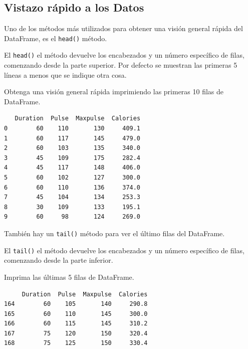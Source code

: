 \subsection{Vistazo rápido a los Datos}

Uno de los métodos más utilizados para obtener una visión general rápida
del DataFrame, es el \texttt{head()} método.

El \texttt{head()} el método devuelve los encabezados y un número
específico de filas, comenzando desde la parte superior. Por defecto se
muestran las primeras 5 líneas a menos que se indique otra cosa. \\

\begin{code} Obtenga una visión general rápida imprimiendo las primeras 10 filas de DataFrame.

\begin{Shaded}
\begin{Highlighting}[]

\OperatorTok{=}\NormalTok{)}

\NormalTok{))}
\end{Highlighting}
\end{Shaded}

\begin{verbatim}
   Duration  Pulse  Maxpulse  Calories
0        60    110       130     409.1
1        60    117       145     479.0
2        60    103       135     340.0
3        45    109       175     282.4
4        45    117       148     406.0
5        60    102       127     300.0
6        60    110       136     374.0
7        45    104       134     253.3
8        30    109       133     195.1
9        60     98       124     269.0
\end{verbatim}
\end{code}

También hay un \texttt{tail()} método para ver el último filas del
DataFrame.

El \texttt{tail()} el método devuelve los encabezados y un número
específico de filas, comenzando desde la parte inferior. \\

\begin{code} Imprima las últimas 5 filas de DataFrame.

\begin{Shaded}
\begin{Highlighting}[]
\end{Highlighting}
\end{Shaded}

\begin{verbatim}
     Duration  Pulse  Maxpulse  Calories
164        60    105       140     290.8
165        60    110       145     300.0
166        60    115       145     310.2
167        75    120       150     320.4
168        75    125       150     330.4
\end{verbatim}
\end{code}

